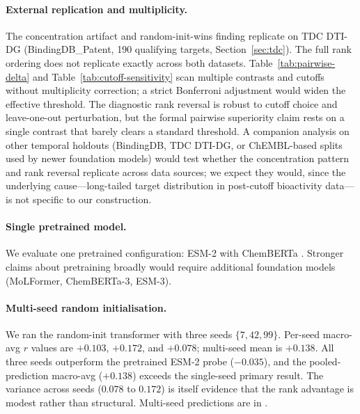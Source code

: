 \documentclass[11pt,a4paper]{article}
\begin{document}
\paragraph{External replication and multiplicity.}
The concentration artifact and random-init-wins finding replicate on TDC
DTI-DG (BindingDB\_Patent, 190 qualifying targets, Section~\ref{sec:tdc}).
The full rank ordering does not replicate exactly across both datasets.
Table~\ref{tab:pairwise-delta} and Table~\ref{tab:cutoff-sensitivity} scan
multiple contrasts and cutoffs without multiplicity correction; a strict
Bonferroni adjustment would widen the effective threshold.
The diagnostic rank reversal is robust to cutoff choice and leave-one-out
perturbation, but the formal pairwise superiority claim rests on a single
contrast that barely clears a standard threshold.
A companion analysis on other temporal holdouts (BindingDB, TDC DTI-DG, or
ChEMBL-based splits used by newer foundation models) would test whether
the concentration pattern and rank reversal replicate across data sources;
we expect they would, since the underlying cause---long-tailed target
distribution in post-cutoff bioactivity data---is not specific to
our construction.

\paragraph{Single pretrained model.}
We evaluate one pretrained configuration: ESM-2  with
ChemBERTa .
Stronger claims about pretraining broadly would require additional foundation
models (MoLFormer, ChemBERTa-3, ESM-3).

\paragraph{Multi-seed random initialisation.}
We ran the random-init transformer with three seeds $\{7, 42, 99\}$.
Per-seed macro-avg $r$ values are $+0.103$, $+0.172$, and $+0.078$;
multi-seed mean is $+0.138$.
All three seeds outperform the pretrained ESM-2 probe ($-0.035$), and the
pooled-prediction macro-avg ($+0.138$) exceeds the single-seed primary result.
The variance across seeds ($0.078$ to $0.172$) is itself evidence that
the rank advantage is modest rather than structural.
Multi-seed predictions are in
.
\end{document}
